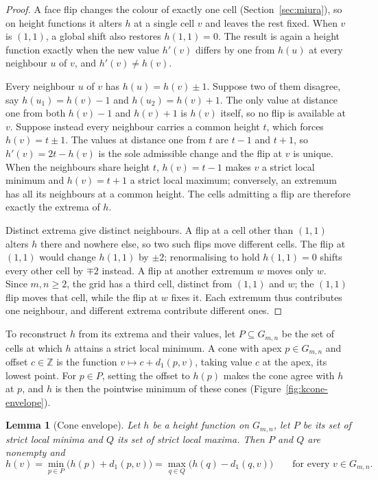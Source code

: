 \documentclass[11pt]{article}
\newtheorem{lemma}[theorem]{Lemma}
\theoremstyle{definition}
\theoremstyle{remark}
\newcommand{\dgrid}{d_1}
\newcommand{\Z}{\mathbb{Z}}
\newcommand{\Gmn}{G_{m,n}}
\begin{document}
\begin{proof}
A face flip changes the colour of exactly one cell
(Section~\ref{sec:miura}), so on height functions it alters $h$ at a single cell
$v$ and leaves the rest fixed. When $v$ is $(1,1)$, a global shift also restores
$h(1,1)=0$.
The result is again a height function exactly when the new value $h'(v)$ differs
by one from $h(u)$ at every neighbour $u$ of $v$, and $h'(v)\ne h(v)$.

\medskip\noindent
Every neighbour $u$ of $v$ has $h(u)=h(v)\pm1$. Suppose two of them disagree,
say $h(u_1)=h(v)-1$ and $h(u_2)=h(v)+1$. The only value at distance one from
both $h(v)-1$ and $h(v)+1$ is $h(v)$ itself, so no flip is available at $v$.
Suppose instead every neighbour carries a common height $t$, which forces
$h(v)=t\pm1$. The values at distance one from $t$ are $t-1$ and $t+1$, so
$h'(v)=2t-h(v)$ is the sole admissible change and the flip at $v$ is unique. When
the neighbours share height $t$, $h(v)=t-1$ makes $v$ a strict local minimum and
$h(v)=t+1$ a strict local maximum; conversely, an extremum has all its
neighbours at a common height. The cells admitting a flip are therefore exactly
the extrema of $h$.

\medskip\noindent
Distinct extrema give distinct neighbours. A flip at a cell other than $(1,1)$
alters $h$ there and nowhere else, so two such flips move different cells. The
flip at $(1,1)$ would change $h(1,1)$ by $\pm2$; renormalising to hold
$h(1,1)=0$ shifts every other cell by $\mp2$ instead. A flip at another extremum
$w$ moves only $w$. Since $m,n\ge2$, the grid has a third cell, distinct from
$(1,1)$ and $w$; the $(1,1)$ flip moves that cell, while the flip at $w$ fixes
it. Each extremum
thus contributes one neighbour, and different extrema contribute different ones.
\end{proof}

To reconstruct $h$ from its extrema and their values, let
$P \subseteq \Gmn$ be the set of cells at which $h$ attains a strict
local minimum. A cone with apex
$p\in\Gmn$ and offset $c\in\Z$ is the function $v\mapsto c+\dgrid(p,v)$,
taking value $c$ at the apex, its lowest point. For $p\in P$, setting the offset to $h(p)$
makes the cone agree with $h$ at $p$, and $h$ is then the pointwise minimum of
these cones (Figure~\ref{fig:kcone-envelope}).

\begin{lemma}[Cone envelope]\label{lem:coneenv}
Let $h$ be a height function on $\Gmn$, let $P$ be its set of strict local
minima and $Q$ its set of strict local maxima. Then $P$ and $Q$ are nonempty
and
\begin{equation}\label{eq:env}
  h(v)=\min_{p\in P}\big(h(p)+\dgrid(p,v)\big)
      =\max_{q\in Q}\big(h(q)-\dgrid(q,v)\big)\qquad\text{for every }v\in\Gmn.
\end{equation}
\end{lemma}
\end{document}
